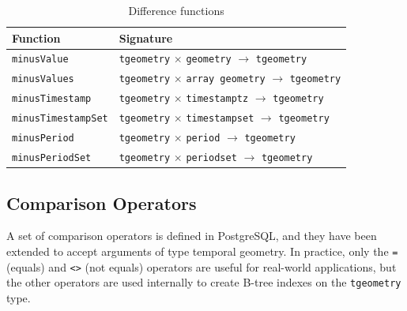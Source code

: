 \begin{table}[htb]
    \centering
    \begin{tabularx}{\textwidth}{|l|X|}
    \hline
    \textbf{Function}   & \textbf{Signature} \\ 
    \hline
    \lstinline+minusValue+             & \lstinline+tgeometry+ $\times$ \lstinline+geometry+ $\rightarrow$ \lstinline+tgeometry+\\
    \hline
    \lstinline+minusValues+            & \lstinline+tgeometry+ $\times$ \lstinline+array geometry+ $\rightarrow$ \lstinline+tgeometry+\\
    \hline
    \lstinline+minusTimestamp+         & \lstinline+tgeometry+ $\times$ \lstinline+timestamptz+ $\rightarrow$ \lstinline+tgeometry+ \\
    \hline
    \lstinline+minusTimestampSet+      & \lstinline+tgeometry+ $\times$ \lstinline+timestampset+ $\rightarrow$ \lstinline+tgeometry+ \\
    \hline
    \lstinline+minusPeriod+            & \lstinline+tgeometry+ $\times$ \lstinline+period+ $\rightarrow$ \lstinline+tgeometry+ \\
    \hline
    \lstinline+minusPeriodSet+         & \lstinline+tgeometry+ $\times$ \lstinline+periodset+ $\rightarrow$ \lstinline+tgeometry+ \\
    \hline
    \end{tabularx}
    \caption{Difference functions}
    \label{table:diff_funcs}
\end{table}

\subsection{Comparison Operators}
\label{section:comparison_funcs}

A set of comparison operators is defined in PostgreSQL, and they have been extended to accept arguments of type temporal geometry. In practice, only the \lstinline+=+ (equals) and \lstinline+<>+ (not equals) operators are useful for real-world applications, but the other operators are used internally to create B-tree indexes on the \lstinline+tgeometry+ type.


